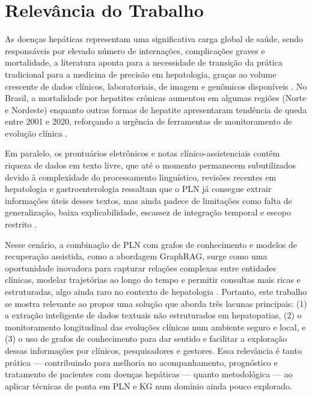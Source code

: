 \chapter{Relevância do Trabalho}\label{cap:relevancia}

As doenças hepáticas representam uma significativa carga global de saúde, sendo responsáveis por elevado número de internações, complicações graves e mortalidade, a literatura aponta para a necessidade de transição da prática tradicional para a medicina de precisão em hepatologia, graças ao volume crescente de dados clínicos, laboratoriais, de imagem e genômicos disponíveis \citep{SABRIE2023350}. No Brasil, a mortalidade por hepatites crônicas aumentou em algumas regiões (Norte e Nordeste) enquanto outras formas de hepatite apresentaram tendência de queda entre 2001 e 2020, reforçando a urgência de ferramentas de monitoramento de evolução clínica \citep{sousa2023}. 

Em paralelo, os prontuários eletrônicos e notas clínico-assistenciais contêm riqueza de dados em texto livre, que até o momento permanecem subutilizados devido à complexidade do processamento linguístico, revisões recentes em hepatologia e gastroenterologia ressaltam que o PLN já consegue extrair informações úteis desses textos, mas ainda padece de limitações como falta de generalização, baixa explicabilidade, escassez de integração temporal e escopo restrito \citep{omar2025}. 

Nesse cenário, a combinação de PLN com grafos de conhecimento e modelos de recuperação assistida, como a abordagem GraphRAG, surge como uma oportunidade inovadora para capturar relações complexas entre entidades clínicas, modelar trajetórias ao longo do tempo e permitir consultas mais ricas e estruturadas, algo ainda raro no contexto de hepatologia \citep{stammers2025}. Portanto, este trabalho se mostra relevante ao propor uma solução que aborda três lacunas principais: (1) a extração inteligente de dados textuais não estruturados em hepatopatias, (2) o monitoramento longitudinal das evoluções clínicas num ambiente seguro e local, e (3) o uso de grafos de conhecimento para dar sentido e facilitar a exploração dessas informações por clínicos, pesquisadores e gestores. Essa relevância é tanto prática — contribuindo para melhoria no acompanhamento, prognóstico e tratamento de pacientes com doenças hepáticas — quanto metodológica — ao aplicar técnicas de ponta em PLN e KG num domínio ainda pouco explorado.  
